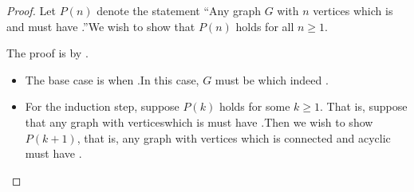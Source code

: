 \documentclass{tufte-handout}
\begin{document}
\begin{proof}
  Let $P(n)$ denote the statement ``Any graph $G$ with $n$ vertices
  which is \blank and \blank\linebreak
  must have \blank.''\linebreak  We wish to show
  that $P(n)$ holds for all $n \geq 1$.

  The proof is by \blank.
  \begin{itemize}
  \item The base case is when \blank.\linebreak In this case, $G$ must
    be \blank\linebreak which indeed \blank.
  \item For the induction step, suppose $P(k)$ holds for some $k \geq
    1$.  That is, suppose that any graph with \blank vertices\linebreak which is
    \blank\linebreak must have \blank.\linebreak  Then we wish to show
    $P(k+1)$, that is, any graph with \blank\linebreak vertices which is
    connected and acyclic must have \blank.


\end{itemize}
\end{proof}
\end{document}
